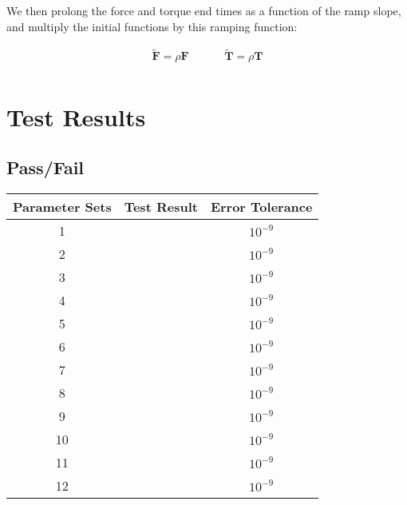 \begin{enumerate}
	
	
	We then prolong the force and torque end times as a function of the ramp slope, and multiply the initial functions by this ramping function:
	
	\begin{align}
		\tilde{\bm F} = \rho \bm F &\hspace{1cm} \tilde{\bm T} =\rho \bm T  \\ 
	\end{align}
	
\end{enumerate}



\section{Test Results}

\subsection{Pass/Fail}

\begin{center}
	\begin{tabular}{|c|c|c|}
		\hline
		Parameter Sets & Test Result & Error Tolerance \\ \hline \hline
		1  & & $10^{-9}$ \\ \hline
		2  & & $10^{-9}$ \\ \hline
		3  & & $10^{-9}$ \\ \hline
		4  && $10^{-9}$ \\ \hline
		5  && $10^{-9}$ \\ \hline
		6  &  & $10^{-9}$ \\ \hline
		7  && $10^{-9}$ \\ \hline
		8  & & $10^{-9}$ \\ \hline
		9  & & $10^{-9}$ \\ \hline
		10  && $10^{-9}$ \\ \hline
		11  & & $10^{-9}$ \\ \hline
		12  & & $10^{-9}$ \\ 
		\hline
		
	\end{tabular}
\end{center}

